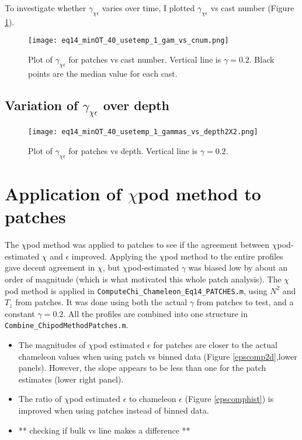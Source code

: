 \documentclass[11pt]{article}
\begin{document}
To investigate whether $\gamma_{\chi\epsilon}$ varies over time, I plotted $\gamma_{\chi\epsilon}$ vs cast number (Figure \ref{gamvscnum}).

\begin{figure}[htbp]
\texttt{[image: eq14\_minOT\_40\_usetemp\_1\_gam\_vs\_cnum.png]}
\caption{Plot of $\gamma_{\chi\epsilon}$ for patches vs cast number. Vertical line is $\gamma=0.2$. Black points are the median value for each cast.}
\label{gamvscnum}
\end{figure}




\clearpage
\subsection{Variation of $\gamma_{\chi\epsilon}$ over depth}

\begin{figure}[htbp]
\texttt{[image: eq14\_minOT\_40\_usetemp\_1\_gammas\_vs\_depth2X2.png]}
\caption{Plot of $\gamma_{\chi\epsilon}$ for patches vs depth. Vertical line is $\gamma=0.2$. }
\label{gamvsdepth}
\end{figure}





\clearpage
\section{Application of $\chi$pod method to patches}

The $\chi$pod method was applied to patches to see if the agreement between $\chi$pod-estimated $\chi$ and $\epsilon$ improved. Applying the $\chi$pod method to the entire profiles gave decent agreement in $\chi$, but $\chi$pod-estimated $\gamma$ was biased low by about an order of magnitude (which is what motivated this whole patch analysis).  The $\chi$pod method is applied in \verb+ComputeChi_Chameleon_Eq14_PATCHES.m+, using $N^2$ and $T_z$ from patches. It was done using both the actual $\gamma$ from patches to test, and a constant $\gamma=0.2$. All the profiles are combined into one structure in \verb+Combine_ChipodMethodPatches.m+.

\begin{itemize}
\item The magnitudes of $\chi$pod estimated $\epsilon$ for patches are closer to the actual chameleon values when using patch vs binned data (Figure \ref{epscomp2d},lower panels). However, the slope appears to be less than one for the patch estimates (lower right panel).
\item The ratio of $\chi$pod estimated $\epsilon$ to chameleon $\epsilon$ (Figure \ref{epscomphist}) is improved when using patches instead of binned data. 
\item ** checking if bulk vs line makes a difference **
\end{itemize}
\end{document}
